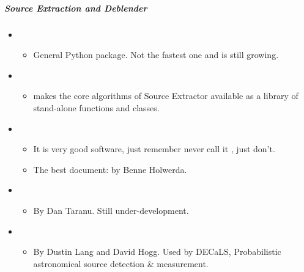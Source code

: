 \documentclass[letterpaper,10pt,english]{sphinxmanual}
\begin{document}
\subparagraph{Source Extraction and Deblender}
\label{\detokenize{resource/astro/topics/photometry:source-extraction-and-deblender}}\begin{itemize}
\item {} 
\begin{itemize}
\item {} 
General Python package. Not the fastest one and is still growing.

\end{itemize}

\item {} 
\begin{itemize}
\item {} 
 makes the core algorithms of Source Extractor available as
a library of stand-alone functions and classes.

\end{itemize}

\item {} 
\begin{itemize}
\item {} 
It is very good software, just remember never call it ,
just don’t.

\item {} 
The best document:  by
Benne Holwerda.

\end{itemize}

\item {} 
\begin{itemize}
\item {} 
By Dan Taranu. Still under-development.

\end{itemize}

\item {} 
\begin{itemize}
\item {} 
By Dustin Lang and David Hogg. Used by DECaLS, Probabilistic
astronomical source detection \& measurement.


\end{itemize}
\end{itemize}
\end{document}
